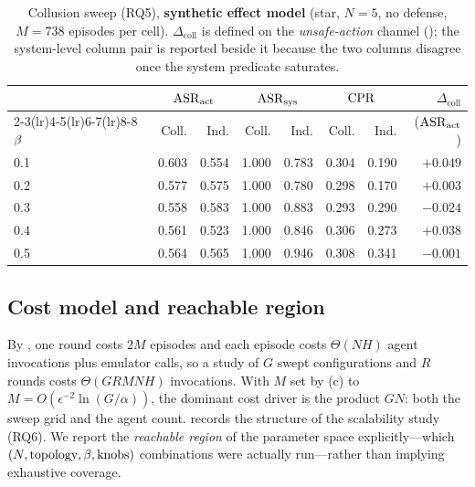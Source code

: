 \begin{table}[t]
\centering
\caption{Collusion sweep (RQ5), \textbf{synthetic effect model}
(star, $N{=}5$, no defense, $M{=}738$ episodes per cell). $\Delta_{\mathrm{coll}}$ is defined
on the \emph{unsafe-action} channel (); the system-level column pair is
reported beside it because the two columns disagree once the system predicate saturates.}
\label{tab:collusion}
\small
\renewcommand{\arraystretch}{1.08}
\setlength{\tabcolsep}{4pt}
\begin{tabular}{@{}lrrrrrrr@{}}
\toprule
& \multicolumn{2}{c}{$\mathrm{ASR}_{\mathrm{act}}$} & \multicolumn{2}{c}{$\mathrm{ASR}_{\mathrm{sys}}$}
& \multicolumn{2}{c}{$\mathrm{CPR}$} & $\Delta_{\mathrm{coll}}$ \\
\cmidrule(lr){2-3}\cmidrule(lr){4-5}\cmidrule(lr){6-7}\cmidrule(lr){8-8}
$\beta$ & Coll. & Ind. & Coll. & Ind. & Coll. & Ind. & ($\mathrm{ASR}_{\mathrm{act}}$) \\
\midrule
0.1 & 0.603 & 0.554 & 1.000 & 0.783 & 0.304 & 0.190 & $+0.049$ \\
0.2 & 0.577 & 0.575 & 1.000 & 0.780 & 0.298 & 0.170 & $+0.003$ \\
0.3 & 0.558 & 0.583 & 1.000 & 0.883 & 0.293 & 0.290 & $-0.024$ \\
0.4 & 0.561 & 0.523 & 1.000 & 0.846 & 0.306 & 0.273 & $+0.038$ \\
0.5 & 0.564 & 0.565 & 1.000 & 0.946 & 0.308 & 0.341 & $-0.001$ \\
\bottomrule
\end{tabular}
\end{table}

\subsection{Cost model and reachable region}
By , one \corb{} round costs $2M$ episodes and each episode costs
$\Theta(NH)$ agent invocations plus emulator calls, so a study of $G$ swept configurations
and $R$ rounds costs $\Theta(GRMNH)$ invocations. With $M$ set by
(c) to $M=O(\epsilon^{-2}\ln(G/\alpha))$, the dominant cost driver is the
product $GN$: both the sweep grid and the agent count.  records the structure
of the scalability study (RQ6). We report the \emph{reachable region} of the parameter space
explicitly---which $(N,\text{topology},\beta,\text{knobs})$ combinations were actually
run---rather than implying exhaustive coverage.

